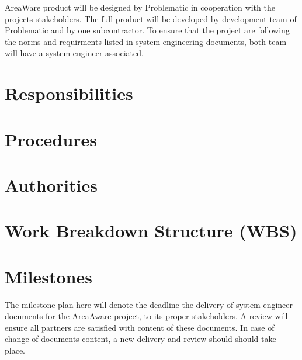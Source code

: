 \noindent AreaWare product will be designed by Problematic in cooperation with the projects stakeholders.
The full product will be developed by development team of Problematic and by one subcontractor.
To ensure that the project are following the norms and requirments listed in system engineering documents, both team will have a system engineer associated.






\section{Responsibilities}

\section{Procedures}

\section{Authorities}

\section{Work Breakdown Structure (WBS)}



\section{Milestones}
\label{plan:milestone}
The milestone plan here will denote the deadline the delivery of system engineer documents for the AreaAware project, to its proper stakeholders.
A review will ensure all partners are satisfied with content of these documents.
In case of change of documents content, a new delivery and review should should take place. 

